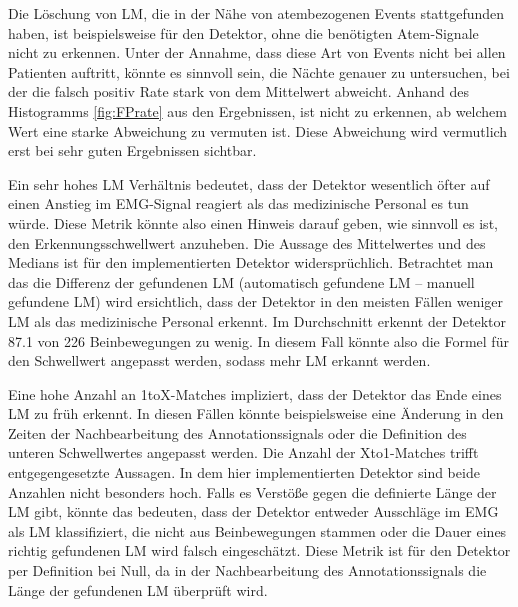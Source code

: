 Die Löschung von LM, die in der Nähe von atembezogenen Events stattgefunden haben, ist beispielsweise für den Detektor, ohne die benötigten Atem-Signale nicht zu erkennen. Unter der Annahme, dass diese Art von Events nicht bei allen Patienten auftritt, könnte es sinnvoll sein, die Nächte genauer zu untersuchen, bei der die falsch positiv Rate stark von dem Mittelwert abweicht. Anhand des  Histogramms \ref{fig:FPrate} aus den Ergebnissen, ist nicht zu erkennen, ab welchem Wert eine starke Abweichung zu vermuten ist. Diese Abweichung wird vermutlich erst bei sehr guten Ergebnissen sichtbar.


Ein sehr hohes LM Verhältnis bedeutet, dass der Detektor wesentlich öfter auf einen Anstieg im EMG-Signal reagiert als das medizinische Personal es tun würde. Diese Metrik könnte also einen Hinweis darauf geben, wie sinnvoll es ist, den Erkennungsschwellwert anzuheben. Die Aussage des Mittelwertes und des Medians ist für den implementierten Detektor widersprüchlich. Betrachtet man das die Differenz der gefundenen LM (automatisch gefundene LM – manuell gefundene LM) wird ersichtlich, dass der Detektor in den meisten Fällen weniger LM als das medizinische Personal erkennt. Im Durchschnitt erkennt der Detektor 87.1 von 226 Beinbewegungen zu wenig. In diesem Fall könnte also die Formel für den Schwellwert angepasst werden, sodass mehr LM erkannt werden. 



Eine hohe Anzahl an 1toX-Matches impliziert, dass der Detektor das Ende eines LM zu früh erkennt. In diesen Fällen könnte beispielsweise eine Änderung in den Zeiten der Nachbearbeitung des Annotationssignals oder die Definition des unteren Schwellwertes angepasst werden. Die Anzahl der Xto1-Matches trifft entgegengesetzte Aussagen. In dem hier implementierten Detektor sind beide Anzahlen nicht besonders hoch.
Falls es Verstöße gegen die definierte Länge der LM gibt, könnte das bedeuten, dass der Detektor entweder Ausschläge im EMG als LM klassifiziert, die nicht aus Beinbewegungen stammen oder die Dauer eines richtig gefundenen LM wird falsch eingeschätzt. Diese Metrik ist für den Detektor per Definition bei Null, da in der Nachbearbeitung des Annotationssignals die Länge der gefundenen LM überprüft wird.


